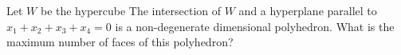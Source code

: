Let $W$ be the hypercube   The intersection of $W$ and a hyperplane parallel to $x_1+x_2+x_3+x_4=0$ is a non-degenerate dimensional polyhedron.  What is the maximum number of faces of this polyhedron?